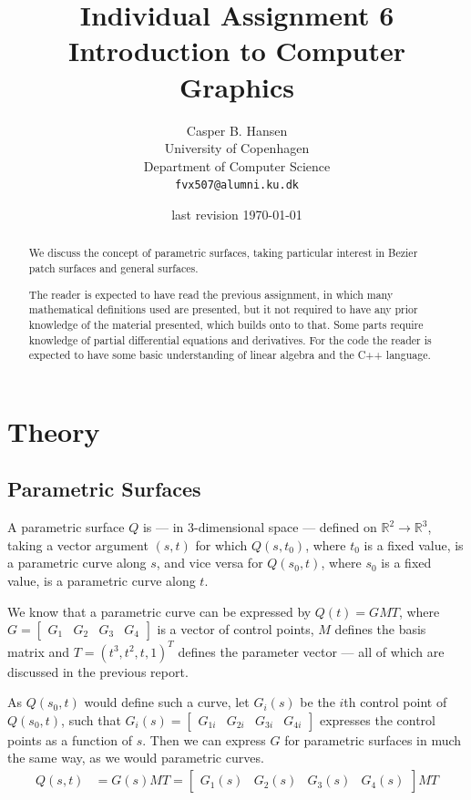 \documentclass[11pt]{article}
\title
{
    {\Large Individual Assignment 6} \\
    Introduction to Computer Graphics
}
\author
{
    Casper B. Hansen \\
    University of Copenhagen \\
    Department of Computer Science \\
    {\tt fvx507@alumni.ku.dk}
}
\date{last revision \today}
\newcommand{\imp}{\rightarrow}
\begin{document}
\clearpage\maketitle\vspace{1in}
\begin{multicols}{2}
    \begin{abstract}
        We discuss the concept of parametric surfaces, taking particular
        interest in Bezier patch surfaces and general surfaces.
        
        The reader is expected to have read the previous assignment, in which
        many mathematical definitions used are presented, but it not required
        to have any prior knowledge of the material presented, which builds
        onto to that. Some parts require knowledge of partial differential
        equations and derivatives. For the code the reader is expected to
        have some basic understanding of linear algebra and the C++ language.
    \end{abstract}
    \vfill\columnbreak\tableofcontents\vfill
\end{multicols}
\thispagestyle{empty}\newpage

\section{Theory}

\subsection{Parametric Surfaces}
A parametric surface $Q$ is --- in 3-dimensional space --- defined on
$\mathbb{R}^2 \imp \mathbb{R}^3$, taking a vector argument $(s,t)$ for which
$Q(s,t_0)$, where $t_0$ is a fixed value, is a parametric curve along $s$, and
vice versa for $Q(s_0,t)$, where $s_0$ is a fixed value, is a parametric curve
along $t$.

We know that a parametric curve can be expressed by $Q(t) = GMT$, where $G =
\begin{bmatrix} G_1 & G_2 & G_3 & G_4 \end{bmatrix}$ is a vector of control
points, $M$ defines the basis matrix and $T = (t^3, t^2, t, 1)^T$ defines the
parameter vector --- all of which are discussed in the previous report.

As $Q(s_0,t)$ would define such a curve, let $G_i(s)$ be the $i$th control
point of $Q(s_0,t)$, such that $G_i(s) = \begin{bmatrix} G_{1i} & G_{2i} &
G_{3i} & G_{4i} \end{bmatrix}$ expresses the control points as a function of
$s$. Then we can express $G$ for parametric surfaces in much the same way, as
we would parametric curves.
\begin{align}
    \label{eqn:q(s,t)}
    Q(s,t) &= G(s)MT =
    \begin{bmatrix}
        G_1(s) & G_2(s) & G_3(s) & G_4(s)
    \end{bmatrix}
    MT
\end{align}
\end{document}
